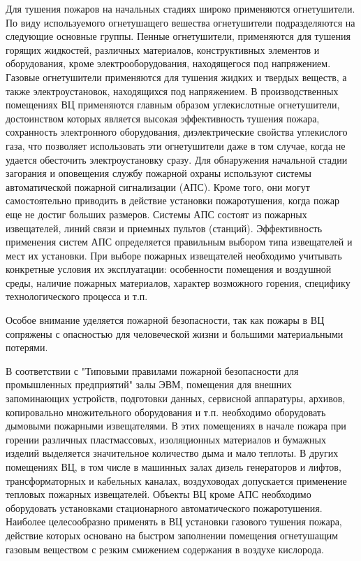 Для тушения пожаров на начальных стадиях широко применяются огнетушители. По виду используемого огнетушащего
вешества огнетушители подразделяются на следующие основные группы. Пенные огнетушители, применяются для тушения
горящих жидкостей, различных материалов, конструктивных элементов и оборудования, кроме электрооборудования,
находящегося под напряжением. Газовые огнетушители применяются для тушения жидких и твердых веществ, а также
электроустановок, находящихся под напряжением. В производственных помещениях ВЦ применяются главным образом
углекислотные огнетушители, достоинством которых является высокая эффективность тушения пожара, сохранность
электронного оборудования, диэлектрические свойства углекислого газа, что позволяет использовать эти огнетушители
даже в том случае, когда не удается обесточить электроустановку сразу. Для обнаружения начальной стадии
загорания и оповещения службу пожарной охраны используют системы автоматической пожарной сигнализации (АПС).
Кроме того, они могут самостоятельно приводить в действие установки пожаротушения, когда пожар еще не достиг
больших размеров. Системы АПС состоят из пожарных извещателей, линий связи и приемных пультов (станций).
Эффективность применения систем АПС определяется правильным выбором типа извещателей и мест их установки.
При выборе пожарных извещателей необходимо учитывать конкретные условия их эксплуатации: особенности помещения и
воздушной среды, наличие пожарных материалов, характер возможного горения, специфику технологического процесса и т.п.

Особое внимание уделяется пожарной безопасности, так как пожары в ВЦ сопряжены с опасностью для человеческой
жизни и большими материальными потерями.

В соответствии с "Типовыми правилами пожарной безопасности для промышленных предприятий" залы ЭВМ, помещения
для внешних запоминающих устройств, подготовки данных, сервисной аппаратуры, архивов, копировально множительного
оборудования и т.п. необходимо оборудовать дымовыми пожарными извещателями. В этих помещениях в начале пожара
при горении различных пластмассовых, изоляционных материалов и бумажных изделий выделяется значительное количество
дыма и мало теплоты. В других помещениях ВЦ, в том числе в машинных залах дизель генераторов и лифтов, трансформаторных
и кабельных каналах, воздуховодах допускается применение тепловых пожарных извещателей. Объекты ВЦ кроме АПС необходимо
оборудовать установками стационарного автоматического пожаротушения. Наиболее целесообразно применять в ВЦ установки
газового тушения пожара, действие которых основано на быстром заполнении помещения огнетушащим газовым веществом с
резким смижением содержания в воздухе кислорода.

